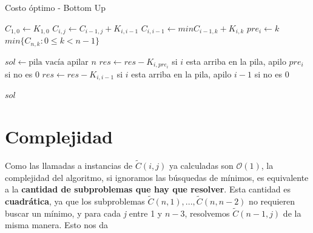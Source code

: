 \documentclass[a4paper]{report}
\begin{document}
\begin{algorithm}[H] \caption{Costo óptimo - Bottom Up}

    \begin{algorithmic}[1]
        \State $C_{1,0} \leftarrow K_{1,0}$ 
                \State $C_{i,j} \leftarrow C_{i-1,j} + K_{i,i-1}$
            \EndFor
            \State $C_{i,i-1} \leftarrow min{ C_{i-1,k} + K_{i,k} }$
            \State $pre_{i} \leftarrow k$
        \EndFor
        \State \Return $min\{ C_{n,k} : 0 \leq k < n-1\}$
        \Comment
        \EndFunction
        
            \State $sol \leftarrow \text{pila vacía}$
            \State apilar $n$
             
                    \State $res \leftarrow res - K_{i,pre_{i}} $
                    \State si $i$ esta arriba en la pila, apilo $pre_{i}$ si no es 0
                    \Else
                    \State $res \leftarrow res - K_{i,i-1} $
                    \State si $i$ esta arriba en la pila, apilo $i-1$ si no es 0
                    \EndIf
                \EndIf
            \EndFor
        \EndFor
            
        \State \Return $sol$
        \EndFunction
    
    \end{algorithmic}

\end{algorithm}

\section{Complejidad}

Como las llamadas a instancias de $\tilde{C}(i,j)$ ya calculadas son $\mathcal{O}(1)$, la complejidad del algoritmo, si ignoramos las búsquedas de mínimos, es equivalente a la \textbf{cantidad de subproblemas que hay que resolver}. Esta cantidad es \textbf{cuadrática}, ya que los subproblemas $\tilde{C}(n,1),...,\tilde{C}(n,n-2)$ no requieren buscar un mínimo, y para cada \textit{j} entre 1 y $n-3$, resolvemos $\tilde{C}(n-1,j)$ de la misma manera. Esto nos da
\end{document}
